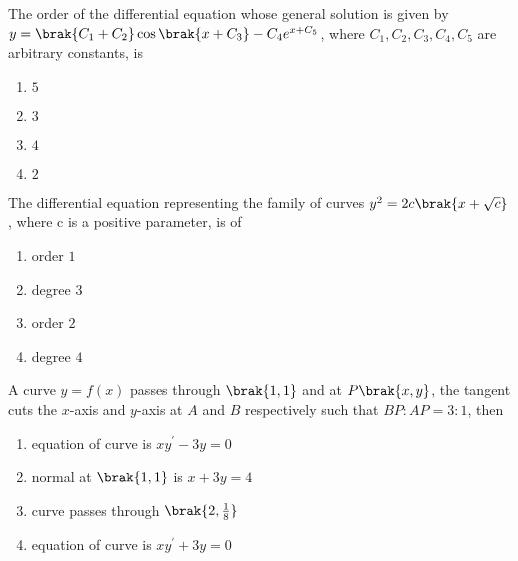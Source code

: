 \iffalse
\title{CHAPTER - 19\\Differential Equations}
\author{AI24BTECH11028 - Ronit Ranjan}
\section{mcq-multiple}
\fi

    
\item The order of the differential equation whose general solution is given by
$y = \brak{C_1 + C_2} \cos \brak{x + C_3} - C_4 e^{x+C_5}$, where $C_1, C_2, C_3, C_4, C_5$ are arbitrary constants, is \hfill {}

\begin{multicols}{2}
\begin{enumerate}
    \item $5$
    \item $3$ 
    \item $4$
    \item $2$ 
\end{enumerate} 
\end{multicols}

\item  The differential equation representing the family of curves
$y^2 = 2c \brak{x + \sqrt{c}}$, where c  is a positive parameter, is of \hfill {}

\begin{multicols}{2}
\begin{enumerate}
    \item order $1$ 
    \item degree $3$
    \item order $2$
    \item degree $4$
\end{enumerate}
\end{multicols}

\item  A curve $ y = f(x) $ passes through $ \brak{1,1} $ and at $ P\brak{x, y} $, the tangent cuts the $ x $-axis and $ y $-axis at $ A $ and $ B $ respectively such that $ BP : AP = 3 : 1 $, then \hfill {}
\begin{enumerate}
    \item equation of curve is $ xy^\prime - 3y = 0 $
    \item normal at $ \brak{1, 1} $ is $ x + 3y = 4 $
    \item curve passes through $ \brak{2, \frac{1}{8}} $
    \item equation of curve is $xy^\prime + 3y = 0 $
\end{enumerate}

